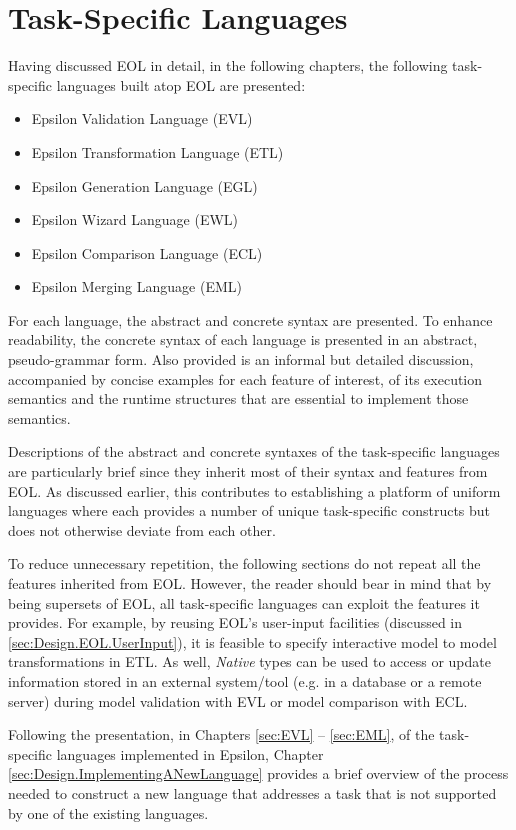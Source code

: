 \section{Task-Specific Languages}
\label{sec:TaskSpecificLanguages}

Having discussed EOL in detail, in the following chapters, the following task-specific languages built atop EOL are presented:

\begin{itemize}
	\item Epsilon Validation Language (EVL)
	\item Epsilon Transformation Language (ETL)
	\item Epsilon Generation Language (EGL)
	\item Epsilon Wizard Language (EWL)
	\item Epsilon Comparison Language (ECL)
	\item Epsilon Merging Language (EML)
\end{itemize}

For each language, the abstract and concrete syntax are presented. To enhance readability, the concrete syntax of each language is presented in an abstract, pseudo-grammar form. Also provided is an informal but detailed discussion, accompanied by concise examples for each feature of interest, of its execution semantics and the runtime structures that are essential to implement those semantics.

Descriptions of the abstract and concrete syntaxes of the task-specific languages are particularly brief since they inherit most of their syntax and features from EOL. As discussed earlier, this contributes to establishing a platform of uniform languages where each provides a number of unique task-specific constructs but does not otherwise deviate from each other.

To reduce unnecessary repetition, the following sections do not repeat all the features inherited from EOL. However, the reader should bear in mind that by being supersets of EOL, all task-specific languages can exploit the features it provides. For example, by reusing EOL's user-input facilities (discussed in \ref{sec:Design.EOL.UserInput}), it is feasible to specify interactive model to model transformations in ETL. As well, \emph{Native} types can be used to access or update information stored in an external system/tool (e.g. in a database or a remote server) during model validation with EVL or model comparison with ECL.

Following the presentation, in Chapters \ref{sec:EVL} -- \ref{sec:EML}, of the task-specific languages implemented in Epsilon, Chapter \ref{sec:Design.ImplementingANewLanguage} provides a brief overview of the process needed to construct a new language that addresses a task that is not supported by one of the existing languages.















